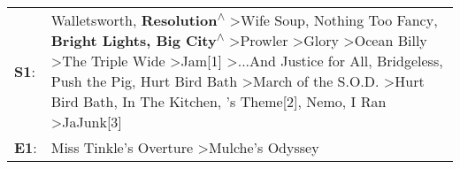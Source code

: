 \begin{supertabular}{p{0.03\textwidth}p{0.92\textwidth}}
 \textbf{S1}:  &  Walletsworth\textsuperscript{}, \enspace \textbf{Resolution\textsuperscript{$\wedge$}} \textgreater \enspace Wife Soup\textsuperscript{}, \enspace Nothing Too Fancy\textsuperscript{}, \enspace \textbf{Bright Lights, Big City\textsuperscript{$\wedge$}} \textgreater \enspace Prowler\textsuperscript{} \textgreater \enspace Glory\textsuperscript{} \textgreater \enspace Ocean Billy\textsuperscript{} \textgreater \enspace The Triple Wide\textsuperscript{} \textgreater \enspace Jam[1]\textsuperscript{} \textgreater \enspace ...And Justice for All\textsuperscript{}, \enspace Bridgeless\textsuperscript{}, \enspace Push the Pig\textsuperscript{}, \enspace Hurt Bird Bath\textsuperscript{} \textgreater \enspace March of the S.O.D.\textsuperscript{} \textgreater \enspace Hurt Bird Bath\textsuperscript{}, \enspace In The Kitchen\textsuperscript{}, 's Theme[2]\textsuperscript{}, \enspace Nemo\textsuperscript{}, \enspace I Ran\textsuperscript{} \textgreater \enspace JaJunk[3]\textsuperscript{}  \enspace  \\
 \textbf{E1}:  &                                                                                                                                                                                                                                                                                                                                                                                                                                                                                                                                                                                                                                                                                                                                                                                                                                                                                                                                            Miss Tinkle's Overture\textsuperscript{} \textgreater \enspace Mulche's Odyssey\textsuperscript{}  \enspace  \\
\end{supertabular}
